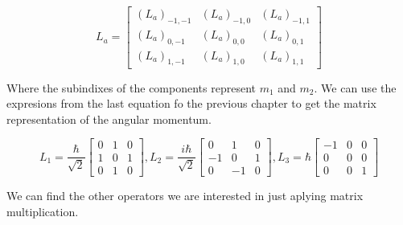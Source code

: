 \begin{equation}
  L_a =
    \left[\begin{matrix}
      (L_a)_{-1,-1} & (L_a)_{-1,0} & (L_a)_{-1,1}\\
      (L_a)_{0,-1} & (L_a)_{0,0} & (L_a)_{0,1}\\
      (L_a)_{1,-1} & (L_a)_{1,0} & (L_a)_{1,1}
    \end{matrix}\right]
\end{equation}

Where the subindixes of the components represent $m_1$ and $m_2$. We can use the expresions from the last equation fo the previous chapter to get the matrix representation of the angular momentum.


\begin{equation}
  L_1 = \frac{\hbar}{\sqrt{2}}
    \left[\begin{matrix}
      0 & 1 & 0\\
      1 & 0 & 1\\
      0 & 1 & 0
    \end{matrix}\right],
  L_2 = \frac{i\hbar}{\sqrt{2}}
    \left[\begin{matrix}
      0 & 1 & 0\\
      -1 & 0 & 1\\
      0 & -1 & 0
    \end{matrix}\right],
  L_3 = \hbar
    \left[\begin{matrix}
      -1 & 0 & 0\\
      0 & 0 & 0\\
      0 & 0 & 1
    \end{matrix}\right]
\end{equation}

We can find the other operators we are interested in just aplying matrix multiplication.

